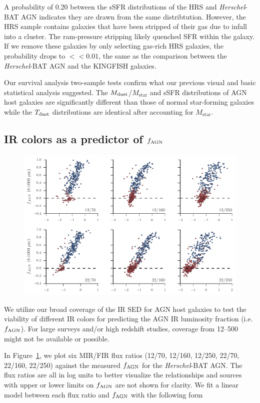 \documentclass[fleqn, usenatbib]{mnras}
\newcommand{\herschel}{\emph{Herschel}}
\newcommand{\mstar}{$M_{\mathrm{star}}$}
\newcommand{\mdust}{$M_{\rm dust}$}
\newcommand{\tdust}{$T_{\rm dust}$}
\begin{document}
A probability of 0.20 between the sSFR distributions of the HRS and \herschel-BAT AGN indicates they are drawn from the same distribtution. However, the HRS sample contains galaxies that have been stripped of their gas due to infall into a cluster. The ram-pressure stripping likely quenched SFR within the galaxy. If we remove these galaxies by only selecting gas-rich HRS galaxies, the probability drops to $<<0.01$, the same as the comparison between the \herschel-BAT AGN and the KINGFISH galaxies.

Our survival analysis two-sample tests confirm what our previous visual and basic statistical analysis suggested. The \mdust/\mstar{} and sSFR distributions of AGN host galaxies are significantly different than those of normal star-forming galaxies while the \tdust{} distributions are identical after accounting for \mstar. 

\subsection{IR colors as a predictor of $f_{\rm AGN}$}

\begin{figure}
\includegraphics[width=\textwidth]{figures/agnfrac_vs_flux_ratio}
\caption{\label{fig:agnfrac_vs_flux_ratio}}
\end{figure}

We utilize our broad coverage of the IR SED for AGN host galaxies to test the viability of different IR colors for predicting the AGN IR luminosity fraction (i.e. $f_{\rm AGN}$). For large surveys and/or high redshift studies, coverage from 12--500 \micron{} might not be available or possible.

In Figure~\ref{fig:agnfrac_vs_flux_ratio}, we plot six MIR/FIR flux ratios (12/70, 12/160, 12/250, 22/70, 22/160, 22/250) against the measured $f_{\rm AGN}$ for the \herschel-BAT AGN. The flux ratios are all in log units to better visualize the relationships and sources with upper or lower limits on $f_{\rm AGN}$ are not shown for clarity. We fit a linear model between each flux ratio and $f_{\rm AGN}$ with the following form
\end{document}
